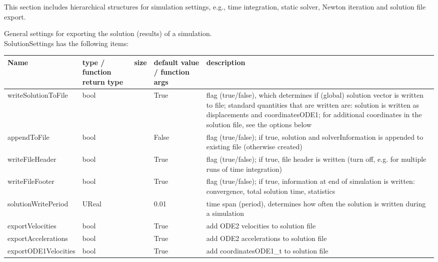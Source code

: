 
This section includes hierarchical structures for simulation settings, e.g., time integration, static solver, Newton iteration and solution file export.

 \label{sec:SolutionSettings}
General settings for exporting the solution (results) of a simulation.\\ 
%
SolutionSettings has the following items:
\begin{center}
  \footnotesize
  \begin{longtable}{| p{4.2cm} | p{2.5cm} | p{0.3cm} | p{3.0cm} | p{6cm} |}
    \hline
    \bf Name & \bf type / function return type & \bf size & \bf default value / function args & \bf description \\ \hline
    writeSolutionToFile &     bool &      &     True &     flag (true/false), which determines if (global) solution vector is written to file; standard quantities that are written are: solution is written as displacements and coordinatesODE1; for additional coordinates in the solution file, see the options below\\ \hline
    appendToFile &     bool &      &     False &     flag (true/false); if true, solution and solverInformation is appended to existing file (otherwise created)\\ \hline
    writeFileHeader &     bool &      &     True &     flag (true/false); if true, file header is written (turn off, e.g. for multiple runs of time integration)\\ \hline
    writeFileFooter &     bool &      &     True &     flag (true/false); if true, information at end of simulation is written: convergence, total solution time, statistics\\ \hline
    solutionWritePeriod &     UReal &      &     0.01 &     time span (period), determines how often the solution is written during a simulation\\ \hline
    exportVelocities &     bool &      &     True &     add ODE2 velocities to solution file\\ \hline
    exportAccelerations &     bool &      &     True &     add ODE2 accelerations to solution file\\ \hline
    exportODE1Velocities &     bool &      &     True &     add coordinatesODE1\_t to solution file\\ \hline

\end{longtable}
\end{center}
